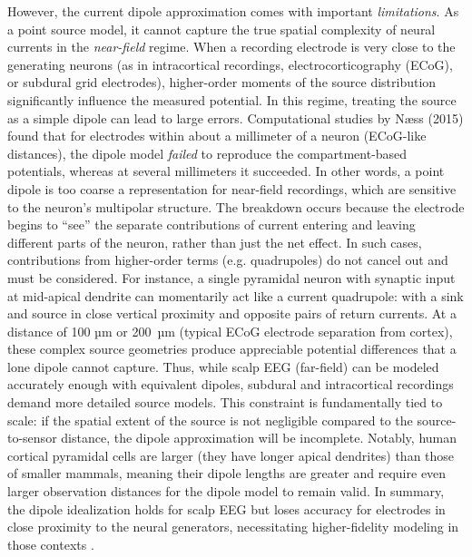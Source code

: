 \documentclass[final, a4paper,masters,en,listoffigures,listoftables,norwegiandates]{NMBU}
\begin{document}
However, the current dipole approximation comes with important \textit{limitations}. As a point source model, it cannot capture the true spatial complexity of neural currents in the \textit{near-field} regime. When a recording electrode is very close to the generating neurons (as in intracortical recordings, electrocorticography (ECoG), or subdural grid electrodes), higher-order moments of the source distribution significantly influence the measured potential. In this regime, treating the source as a simple dipole can lead to large errors. Computational studies by Næss (2015) found that for electrodes within about a millimeter of a neuron (ECoG-like distances), the dipole model \emph{failed} to reproduce the compartment-based potentials, whereas at several millimeters it succeeded. In other words, a point dipole is too coarse a representation for near-field recordings, which are sensitive to the neuron's multipolar structure. The breakdown occurs because the electrode begins to “see” the separate contributions of current entering and leaving different parts of the neuron, rather than just the net effect. In such cases, contributions from higher-order terms (e.g. quadrupoles) do not cancel out and must be considered. For instance, a single pyramidal neuron with synaptic input at mid-apical dendrite can momentarily act like a current quadrupole: with a sink and source in close vertical proximity and opposite pairs of return currents. At a distance of 100 µm or 200~µm (typical ECoG electrode separation from cortex), these complex source geometries produce appreciable potential differences that a lone dipole cannot capture. Thus, while scalp EEG (far-field) can be modeled accurately enough with equivalent dipoles, subdural and intracortical recordings demand more detailed source models. This constraint is fundamentally tied to scale: if the spatial extent of the source is not negligible compared to the source-to-sensor distance, the dipole approximation will be incomplete. Notably, human cortical pyramidal cells are larger (they have longer apical dendrites) than those of smaller mammals, meaning their dipole lengths are greater and require even larger observation distances for the dipole model to remain valid. In summary, the dipole idealization holds for scalp EEG but loses accuracy for electrodes in close proximity to the neural generators, necessitating higher-fidelity modeling in those contexts \cite{Næss2015}.
\end{document}
